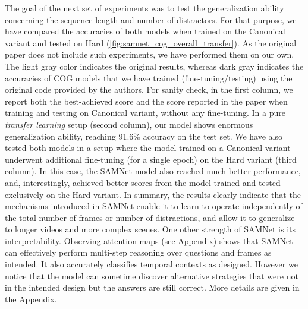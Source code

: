 The goal of the next set of experiments was to test the generalization ability concerning the sequence length and number of distractors.
For that purpose, we have compared the accuracies of both models when trained on the Canonical variant and tested on Hard (\cref{fig:samnet_cog_overall_transfer}).
As the original paper does not include such experiments, we have performed them on our own.  The light gray color indicates the original results, whereas dark gray indicates the accuracies of COG models that we have trained (fine-tuning/testing) using the original code provided by the authors.
For sanity check, in the first column, we report both the best-achieved score and the score reported in the paper when training and testing on Canonical variant, without any fine-tuning.
In a pure \textit{transfer learning} setup (second column), our model shows enormous generalization ability, reaching 91.6\% accuracy on the test set.
We have also tested both models in a setup where the model trained on a Canonical variant underwent additional fine-tuning (for a single epoch) on the Hard variant (third column).
In this case, the SAMNet model also reached much better performance, and, interestingly, achieved better scores from the model trained and tested exclusively on the Hard variant.
In summary, the results clearly indicate that the mechanisms introduced in SAMNet  enable it to learn to operate independently of the total number of frames or number of distractions, and allow it to generalize to longer videos and more complex scenes. One other strength of SAMNet is its interpretability. Observing attention maps (see Appendix) shows that SAMNet can effectively perform multi-step reasoning over questions and frames as intended. It also accurately classifies temporal contexts as designed. However we notice that the model can sometime discover alternative strategies that were not in the intended design but the answers are still correct. More details are given in the Appendix.

